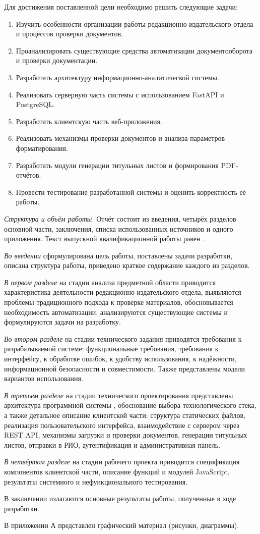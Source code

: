 Для достижения поставленной цели необходимо решить следующие задачи:
\begin{enumerate}
	\item Изучить особенности организации работы редакционно-издательского отдела и процессов проверки документов.
	\item Проанализировать существующие средства автоматизации документооборота и проверки документации.
	\item Разработать архитектуру информационно-аналитической системы.
	\item Реализовать серверную часть системы с использованием FastAPI и PostgreSQL.
	\item Разработать клиентскую часть веб-приложения.
	\item Реализовать механизмы проверки документов и анализа параметров форматирования. 
	\item Разработать модули генерации титульных листов и формирования PDF-отчётов. 
	\item Провести тестирование разработанной системы и оценить корректность её работы.
\end{enumerate}

\textit{Структура и объём работы.} Отчёт состоит из введения, четырёх разделов основной части, заключения, списка использованных источников и одного приложения. Текст выпускной квалификационной работы равен .

\textit{Во введении} сформулирована цель работы, поставлены задачи разработки, описана структура работы, приведено краткое содержание каждого из разделов.

\textit{В первом разделе} на стадии анализа предметной области приводится характеристика деятельности редакционно-издательского отдела, выявляются проблемы традиционного подхода к проверке материалов, обосновывается необходимость автоматизации, анализируются существующие системы и формулируются задачи на разработку.

\textit{Во втором разделе} на стадии технического задания приводятся требования к разрабатываемой системе: функциональные требования, требования к интерфейсу, к обработке ошибок, к удобству использования, к надёжности, информационной безопасности и совместимости. Также представлены модели вариантов использования.

\textit{В третьем разделе} на стадии технического проектирования представлены архитектура программной системы , обоснование выбора технологического стека, а также детальное описание клиентской части: структура статических файлов, реализация пользовательского интерфейса, взаимодействие с сервером через REST API, механизмы загрузки и проверки документов, генерации титульных листов, отправки в РИО, аутентификация и административная панель.

\textit{В четвёртом разделе} на стадии рабочего проекта приводится спецификация компонентов клиентской части, описание функций и модулей JavaScript, результаты системного и нефункционального тестирования.

В заключении излагаются основные результаты работы, полученные в ходе разработки.

В приложении А представлен графический материал (рисунки, диаграммы).